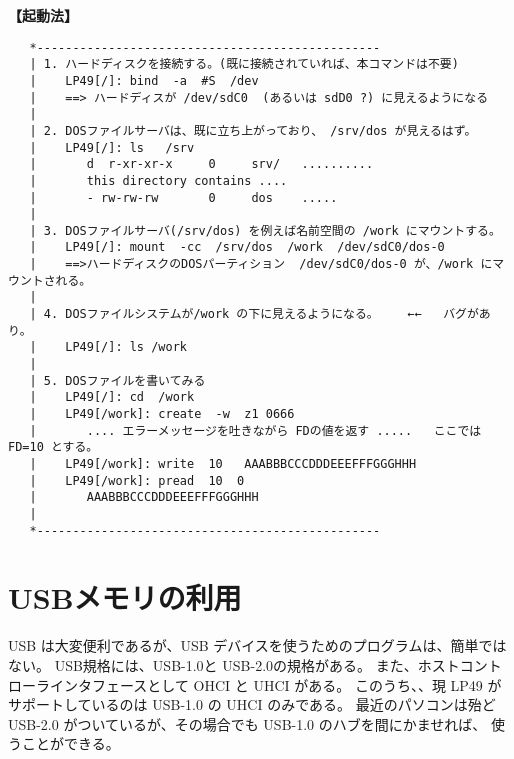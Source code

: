 {\bf 【起動法】}
\begin{verbatim}
   *------------------------------------------------
   | 1. ハードディスクを接続する。(既に接続されていれば、本コマンドは不要)               
   |    LP49[/]: bind  -a  #S  /dev                                                      
   |    ==> ハードディスが /dev/sdC0  (あるいは sdD0 ?) に見えるようになる   
   |
   | 2. DOSファイルサーバは、既に立ち上がっており、 /srv/dos が見えるはず。              
   |    LP49[/]: ls   /srv                                                               
   |       d  r-xr-xr-x     0     srv/   ..........                                      
   |       this directory contains ....                                                  
   |       - rw-rw-rw       0     dos    .....                                           
   |
   | 3. DOSファイルサーバ(/srv/dos) を例えば名前空間の /work にマウントする。            
   |    LP49[/]: mount  -cc  /srv/dos  /work  /dev/sdC0/dos-0                            
   |    ==>ハードディスクのDOSパーティション  /dev/sdC0/dos-0 が、/work にマウントされる。
   |
   | 4. DOSファイルシステムが/work の下に見えるようになる。    ←←   バグがあり。          
   |    LP49[/]: ls /work                                                                 
   |
   | 5. DOSファイルを書いてみる                                                           
   |    LP49[/]: cd  /work                                                                
   |    LP49[/work]: create  -w  z1 0666                                                  
   |       .... エラーメッセージを吐きながら FDの値を返す .....   ここでは FD=10 とする。 
   |    LP49[/work]: write  10   AAABBBCCCDDDEEEFFFGGGHHH                                 
   |    LP49[/work]: pread  10  0                                                         
   |       AAABBBCCCDDDEEEFFFGGGHHH                                                       
   |                                                                                     
   *------------------------------------------------
\end{verbatim}  

\chapter{USBメモリの利用}

      USB は大変便利であるが、USB デバイスを使うためのプログラムは、簡単ではない。
    USB規格には、USB-1.0と USB-2.0の規格がある。
   また、ホストコントローラインタフェースとして OHCI と UHCI がある。
   このうち、、現 LP49 がサポートしているのは USB-1.0 の UHCI のみである。
   最近のパソコンは殆ど USB-2.0 がついているが、その場合でも USB-1.0 のハブを間にかませれば、
   使うことができる。

